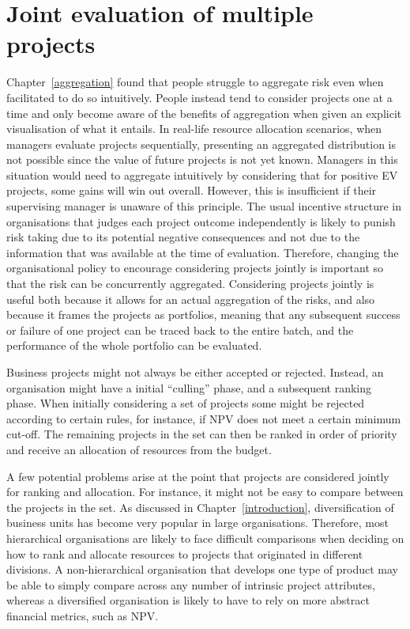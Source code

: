 \documentclass[a4paper, nobind, dvipsnames]{templates/ociamthesis}
\theoremstyle{definition}
\theoremstyle{definition}
\theoremstyle{definition}
\theoremstyle{definition}
\theoremstyle{remark}
\begin{document}
\newpage

\printbibliography[segment=\therefsegment,heading=subbibintoc]

\hypertarget{interstitial-1}{%
\chapter{Joint evaluation of multiple projects}\label{interstitial-1}}

Chapter~\ref{aggregation} found that people struggle to aggregate risk even
when facilitated to do so intuitively. People instead tend to consider projects
one at a time and only become aware of the benefits of aggregation when given an
explicit visualisation of what it entails. In real-life resource allocation
scenarios, when managers evaluate projects sequentially, presenting an
aggregated distribution is not possible since the value of future projects is
not yet known. Managers in this situation would need to aggregate intuitively by
considering that for positive EV projects, some gains will win out overall.
However, this is insufficient if their supervising manager is unaware of this
principle. The usual incentive structure in organisations that judges each
project outcome independently is likely to punish risk taking due to its
potential negative consequences and not due to the information that was
available at the time of evaluation. Therefore, changing the organisational
policy to encourage considering projects jointly is important so that the risk
can be concurrently aggregated. Considering projects jointly is useful both
because it allows for an actual aggregation of the risks, and also because it
frames the projects as portfolios, meaning that any subsequent success or
failure of one project can be traced back to the entire batch, and the
performance of the whole portfolio can be evaluated.

Business projects might not always be either accepted or rejected. Instead, an
organisation might have a initial ``culling'' phase, and a subsequent ranking
phase. When initially considering a set of projects some might be rejected
according to certain rules, for instance, if NPV does not meet a certain minimum
cut-off. The remaining projects in the set can then be ranked in order of
priority and receive an allocation of resources from the budget.

A few potential problems arise at the point that projects are considered jointly
for ranking and allocation. For instance, it might not be easy to compare
between the projects in the set. As discussed in Chapter~\ref{introduction},
diversification of business units has become very popular in large
organisations. Therefore, most hierarchical organisations are likely to face
difficult comparisons when deciding on how to rank and allocate resources to
projects that originated in different divisions. A non-hierarchical organisation
that develops one type of product may be able to simply compare across any
number of intrinsic project attributes, whereas a diversified organisation is
likely to have to rely on more abstract financial metrics, such as NPV.
\end{document}
